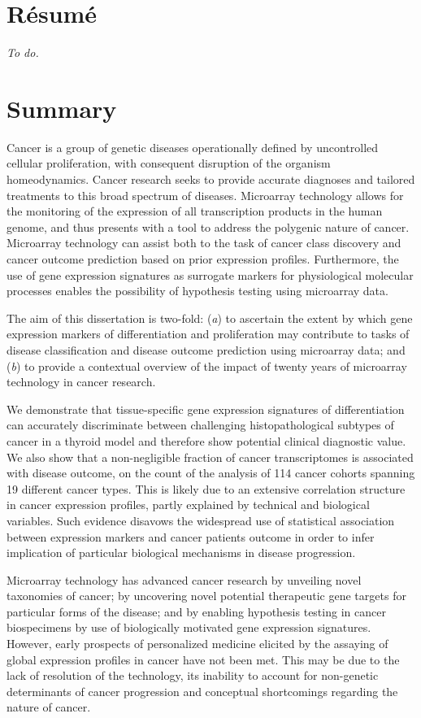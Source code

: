 \chapter*{Résumé}
\emph{To do.}
\clearpage
\blankpage
\chapter*{Summary}

Cancer is a group of genetic diseases operationally defined by uncontrolled
cellular proliferation, with consequent disruption of the organism
homeodynamics.  Cancer research seeks to provide accurate diagnoses and tailored
treatments to this broad spectrum of diseases.  Microarray technology allows for
the monitoring of the expression of all transcription products in the human
genome, and thus presents with a tool to address the polygenic nature of cancer.
Microarray technology can assist both to the task of cancer class discovery and
cancer outcome prediction based on prior expression profiles.  Furthermore, the
use of gene expression signatures as surrogate markers for physiological
molecular processes enables the possibility of hypothesis testing using
microarray data.

The aim of this dissertation is two-fold: (\emph{a}) to ascertain the extent by
which gene expression markers of differentiation and proliferation may
contribute to tasks of disease classification and disease outcome prediction
using microarray data; and (\emph{b}) to provide a contextual overview of the
impact of twenty years of microarray technology in cancer research.

We demonstrate that tissue-specific gene expression signatures of
differentiation can accurately discriminate between challenging
histopathological subtypes of cancer in a thyroid model and therefore show
potential clinical diagnostic value.  We also show that a non-negligible
fraction of cancer transcriptomes is associated with disease outcome, on the
count of the analysis of 114 cancer cohorts spanning 19 different cancer types.
This is likely due to an extensive correlation structure in cancer expression
profiles, partly explained by technical and biological variables.  Such evidence
disavows the widespread use of statistical association between expression
markers and cancer patients outcome in order to infer implication of particular
biological mechanisms in disease progression.

Microarray technology has advanced cancer research by unveiling novel taxonomies
of cancer; by uncovering novel potential therapeutic gene targets for particular
forms of the disease; and by enabling hypothesis testing in cancer biospecimens
by use of biologically motivated gene expression signatures.  However, early
prospects of personalized medicine elicited by the assaying of global expression
profiles in cancer have not been met.  This may be due to the lack of resolution
of the technology, its inability to account for non-genetic determinants of
cancer progression and conceptual shortcomings regarding the nature of cancer.

\clearpage

